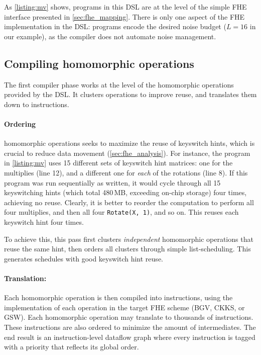 As \autoref{listing:mv} shows, programs in this DSL are at the level of the
simple FHE interface presented in \autoref{sec:fhe_mapping}. There is only one
aspect of the FHE implementation in the DSL: programs encode the desired noise
budget ($L=16$ in our example), as the compiler does not automate noise
management.

\subsection{Compiling homomorphic operations}

The first compiler phase works at the level of the homomorphic operations
provided by the DSL. It clusters operations to improve reuse, and translates
them down to instructions.

\paragraph{Ordering} homomorphic operations seeks to maximize the reuse of
keyswitch hints, which is crucial to reduce data movement
(\autoref{sec:fhe_analysis}). For instance, the program in \autoref{listing:mv}
uses 15 different sets of keyswitch hint matrices: one for the multiplies (line
12), and a different one for \emph{each} of the rotations (line 8). If this
program was run sequentially as written, it would cycle through all 15
keyswitching hints (which total 480\,MB, exceeding on-chip storage) four times,
achieving no reuse. Clearly, it is better to reorder the computation to perform
all four multiplies, and then all four \texttt{Rotate(X, 1)}, and so on. This
reuses each keyswitch hint four times.

To achieve this, this pass first clusters \emph{independent} homomorphic
operations that reuse the same hint, then orders all clusters through simple
list-scheduling. This generates schedules with good keyswitch hint reuse.

\paragraph{Translation:} Each homomorphic operation is then compiled into
instructions, using the implementation of each operation in the target FHE
scheme (BGV, CKKS, or GSW). Each homomorphic operation may translate to
thousands of instructions. These instructions are also ordered to minimize the
amount of intermediates. The end result is an instruction-level dataflow graph
where every instruction is tagged with a priority that reflects its global
order.

